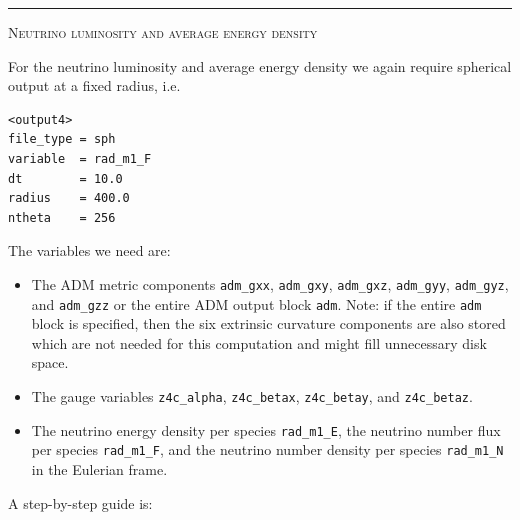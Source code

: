 \documentclass{article}
\newcommand{\var}[1]{%
  {\setlength{\fboxsep}{1.5pt}%
   \colorbox{varbg}{\textcolor{varfg}{\texttt{\small #1}}}}}
\newcommand{\step}[1]{%
  \par\medskip\noindent
  {\color{stepfg}\rule[-0.15ex]{2pt}{1.5ex}\hspace{0.5em}\scshape #1}%
  \hspace{0.75em}\ignorespaces}
\begin{document}
\step{Neutrino luminosity and average energy density}
For the neutrino luminosity and average energy density we again require spherical output at a fixed radius, i.e.
\begin{verbatim}
<output4>
file_type = sph
variable  = rad_m1_F
dt        = 10.0
radius    = 400.0
ntheta    = 256
\end{verbatim}
The variables we need are:
\begin{itemize}
  \item The ADM metric components \var{adm\_gxx}, \var{adm\_gxy}, \var{adm\_gxz},
  \var{adm\_gyy}, \var{adm\_gyz}, and \var{adm\_gzz} or the entire ADM output block \var{adm}. Note:
  if the entire \var{adm} block is specified, then the six extrinsic curvature components are also
  stored which are not needed for this computation and might fill unnecessary disk space.
  \item The gauge variables \var{z4c\_alpha}, \var{z4c\_betax}, \var{z4c\_betay}, and \var{z4c\_betaz}.
  \item The neutrino energy density per species \var{rad\_m1\_E}, the neutrino number flux per species \var{rad\_m1\_F}, and
  the neutrino number density per species \var{rad\_m1\_N} in the Eulerian frame.
\end{itemize}
A step-by-step guide is:
\end{document}
